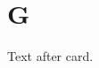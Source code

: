 \documentclass{closettwin}
\begin{document}
\mainmatter
\chapter{G}
Text after card.
\end{document}
